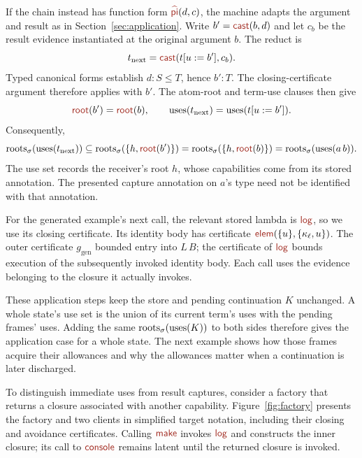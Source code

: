 If the chain instead has function form $\form{pi}(d,c)$, the machine
adapts the argument and result as in Section~\ref{sec:application}.
Write $b'=\cast{b}{d}$ and let $c_b$ be the result evidence instantiated
at the original argument $b$. The reduct is
\[
 t_{\mathrm{next}}=\cast{t[u:=b']}{c_b}.
\]
Typed canonical forms establish $d:S\le T$, hence $b':T$.
The closing-certificate argument therefore applies with $b'$.
The atom-root and term-use clauses then give
\[
 \ev{root}(b')=\ev{root}(b),\qquad
 \uses{t_{\mathrm{next}}}=\uses{t[u:=b']}.
\]
Consequently,
\[
 \roots{\uses{t_{\mathrm{next}}}}
 \subseteq\roots{\{h,\ev{root}(b')\}}
 =\roots{\{h,\ev{root}(b)\}}
 =\roots{\uses{a\,b}}.
\]
The use set records the receiver's root $h$, whose capabilities come
from its stored annotation. The presented capture annotation on $a$'s
type need not be identified with that annotation.

For the generated example's next call, the relevant stored lambda is
$\ev{log}$, so we use its closing certificate. Its identity body has
certificate $\ev{elem}(\{u\},\{\kappa_\ell,u\})$.
The outer certificate $g_{\mathrm{gen}}$ bounded entry into $L\,B$;
the certificate of $\ev{log}$ bounds execution of the subsequently
invoked identity body. Each call uses the evidence belonging to the
closure it actually invokes.

These application steps keep the store and pending continuation $K$
unchanged. A whole state's use set is the union of its current term's
uses with the pending frames' uses. Adding the same $\operatorname{roots}_{\sigma}(\operatorname{uses}(K))$
to both sides therefore gives the application case for a whole state.
The next example shows how those frames acquire their allowances and
why the allowances matter when a continuation is later discharged.


\label{sec:latent}

To distinguish immediate uses from result captures, consider a factory
that returns a closure associated with another capability.
Figure~\ref{fig:factory} presents the factory and two clients in
simplified target notation, including their closing and avoidance
certificates. Calling $\ev{make}$ invokes $\ev{log}$ and constructs the
inner closure; its call to $\ev{console}$ remains latent until the
returned closure is invoked.


